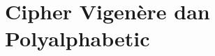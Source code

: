\documentclass[../buku_kriptografi.tex]{subfiles}
\begin{document}
\ifdefined\InMainDocument\else\setcounter{chapter}{5}\fi

\chapter{Cipher Vigenère dan Polyalphabetic}






\ifdefined\InMainDocument\else


\fi
\end{document}
